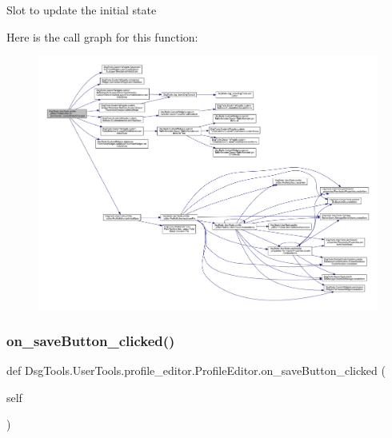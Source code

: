 \begin{DoxyVerb}Slot to update the initial state
\end{DoxyVerb}
 Here is the call graph for this function\+:
\nopagebreak
\begin{figure}[H]
\begin{center}
\leavevmode
\includegraphics[width=350pt]{class_dsg_tools_1_1_user_tools_1_1profile__editor_1_1_profile_editor_a57f897fed81656d7ed6fe6ca0ce5012d_cgraph}
\end{center}
\end{figure}
\mbox{\label{class_dsg_tools_1_1_user_tools_1_1profile__editor_1_1_profile_editor_aff1a716418372461a0d445d3482da1d8}} 
\subsubsection{\texorpdfstring{on\+\_\+save\+Button\+\_\+clicked()}{on\_saveButton\_clicked()}}
{\footnotesize\ttfamily def Dsg\+Tools.\+User\+Tools.\+profile\+\_\+editor.\+Profile\+Editor.\+on\+\_\+save\+Button\+\_\+clicked (\begin{DoxyParamCaption}\item[{}]{self }\end{DoxyParamCaption})}

